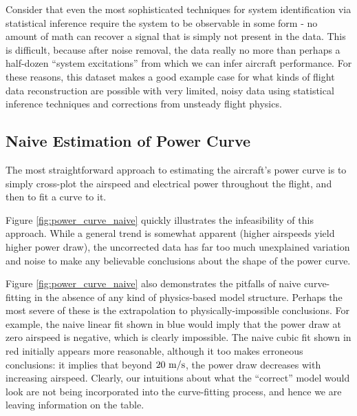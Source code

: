 \documentclass[conf]{new-aiaa}
\begin{document}
    Consider that even the most sophisticated techniques for system identification via statistical inference require the system to be observable in some form - no amount of math can recover a signal that is simply not present in the data. This is difficult, because after noise removal, the data really no more than perhaps a half-dozen ``system excitations'' from which we can infer aircraft performance. For these reasons, this dataset makes a good example case for what kinds of flight data reconstruction are possible with very limited, noisy data using statistical inference techniques and corrections from unsteady flight physics.

    \subsection{Naive Estimation of Power Curve}

    The most straightforward approach to estimating the aircraft's power curve is to simply cross-plot the airspeed and electrical power throughout the flight, and then to fit a curve to it.

    Figure \ref{fig:power_curve_naive} quickly illustrates the infeasibility of this approach. While a general trend is somewhat apparent (higher airspeeds yield higher power draw), the uncorrected data has far too much unexplained variation and noise to make any believable conclusions about the shape of the power curve.

    Figure \ref{fig:power_curve_naive} also demonstrates the pitfalls of naive curve-fitting in the absence of any kind of physics-based model structure. Perhaps the most severe of these is the extrapolation to physically-impossible conclusions. For example, the naive linear fit shown in blue would imply that the power draw at zero airspeed is negative, which is clearly impossible. The naive cubic fit shown in red initially appears more reasonable, although it too makes erroneous conclusions: it implies that beyond $20\ \rm m/s$, the power draw decreases with increasing airspeed. Clearly, our intuitions about what the ``correct'' model would look are not being incorporated into the curve-fitting process, and hence we are leaving information on the table.
\end{document}
